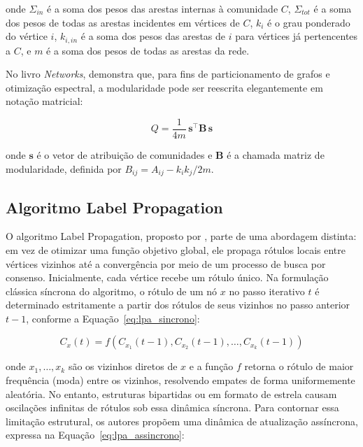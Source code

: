 \documentclass[
      12pt,
      a4paper,
      openright,
      oneside,
      chapter=TITLE,
      section=TITLE,
      english,
      french,
      spanish,
      brazilian
    ]{abntex2}
\begin{document}
    onde $\Sigma_{in}$ é a soma dos pesos das arestas internas à comunidade $C$, $\Sigma_{tot}$ é a soma dos pesos de todas as arestas incidentes em vértices de $C$, $k_i$ é o grau ponderado do vértice $i$, $k_{i,in}$ é a soma dos pesos das arestas de $i$ para vértices já pertencentes a $C$, e $m$ é a soma dos pesos de todas as arestas da rede.
    
    No livro \textit{Networks},  demonstra que, para fins de particionamento de grafos e otimização espectral, a modularidade pode ser reescrita elegantemente em notação matricial:
    
    \begin{equation}
    Q = \frac{1}{4m}\, \mathbf{s}^{\top} \mathbf{B}\, \mathbf{s}
    \label{eq:mod_matricial}
    \end{equation}
    
    onde $\mathbf{s}$ é o vetor de atribuição de comunidades e $\mathbf{B}$ é a chamada matriz de modularidade, definida por $B_{ij} = A_{ij} - k_i k_j / 2m$.
    
    \subsection{Algoritmo Label Propagation}
    
    O algoritmo Label Propagation, proposto por , parte de uma abordagem distinta: em vez de otimizar uma função objetivo global, ele propaga rótulos locais entre vértices vizinhos até a convergência por meio de um processo de busca por consenso. Inicialmente, cada vértice recebe um rótulo único. Na formulação clássica síncrona do algoritmo, o rótulo de um nó $x$ no passo iterativo $t$ é determinado estritamente a partir dos rótulos de seus vizinhos no passo anterior $t-1$, conforme a Equação~\ref{eq:lpa_sincrono}:
    
    \begin{equation}
    C_x(t) = f\left( C_{x_1}(t-1), C_{x_2}(t-1), \dots, C_{x_k}(t-1) \right)
    \label{eq:lpa_sincrono}
    \end{equation}
    
    onde $x_1, \dots, x_k$ são os vizinhos diretos de $x$ e a função $f$ retorna o rótulo de maior frequência (moda) entre os vizinhos, resolvendo empates de forma uniformemente aleatória. No entanto, estruturas bipartidas ou em formato de estrela causam oscilações infinitas de rótulos sob essa dinâmica síncrona. Para contornar essa limitação estrutural, os autores propõem uma dinâmica de atualização assíncrona, expressa na Equação~\ref{eq:lpa_assincrono}:
    
\end{document}
